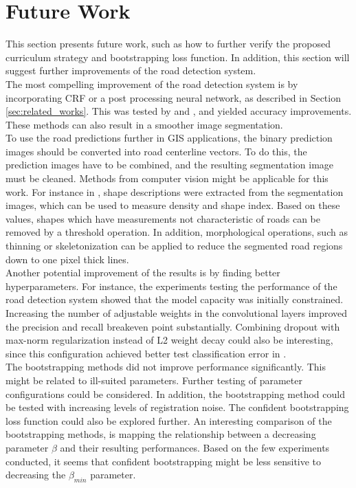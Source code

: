 \section{Future Work}
\label{sec:futureWork}
This section presents future work, such as how to further verify the proposed curriculum strategy and bootstrapping loss function. In addition, this section will suggest further improvements of the road detection system.\\

The most compelling improvement of the road detection system is by incorporating \ac{CRF} or a post processing neural network, as described in Section \ref{sec:related_works}. This was tested by \cite{Kluckner_semantic_height} and \cite{Mnih_aerial_images_noisy}, and yielded accuracy improvements. These methods can also result in a smoother image segmentation. \\

To use the road predictions further in GIS applications, the binary prediction images should be converted into road centerline vectors. To do this, the prediction images have to be combined, and the resulting segmentation image must be cleaned. Methods from computer vision might be applicable for this work. For instance in \citep{Song_road_extraction_svm}, shape descriptions were extracted from the segmentation images, which can be used to measure density and shape index. Based on these values, shapes which have measurements not characteristic of roads can be removed by a threshold operation. In addition, morphological operations, such as thinning or skeletonization can be applied to reduce the segmented road regions down to one pixel thick lines.\\

Another potential improvement of the results is by finding better hyperparameters. For instance, the experiments testing the performance of the road detection system showed that the model capacity was initially constrained. Increasing the number of adjustable weights in the convolutional layers improved the precision and recall breakeven point substantially. Combining dropout with max-norm regularization instead of L2 weight decay could also be interesting, since this configuration achieved better test classification error in \citep{Srivastava_dropout}.\\

The bootstrapping methods did not improve performance significantly. This might be related to ill-suited parameters. Further testing of parameter configurations could be considered. In addition, the bootstrapping method could be tested with increasing levels of registration noise. The confident bootstrapping loss function could also be explored further. An interesting comparison of the bootstrapping methods, is mapping the relationship between a decreasing parameter $\beta$ and their resulting performances. Based on the few experiments conducted, it seems that confident bootstrapping might be less sensitive to decreasing the $\beta_{min}$ parameter.\\

